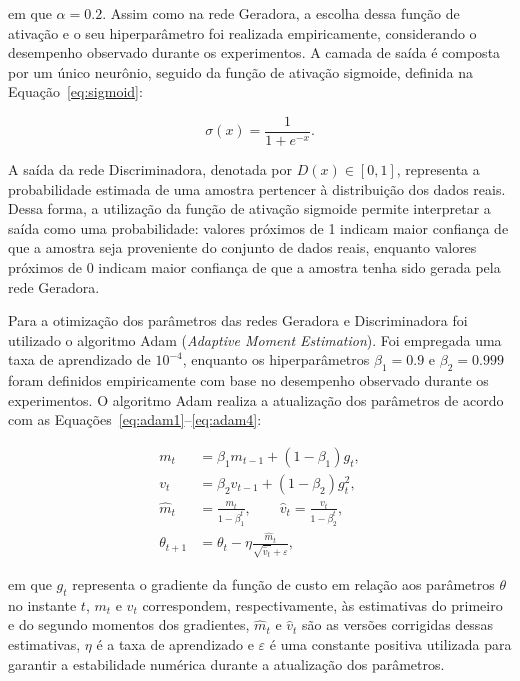 em que $\alpha = 0.2$. Assim como na rede Geradora, a escolha dessa função de ativação e o seu hiperparâmetro foi realizada empiricamente, considerando o desempenho observado durante os experimentos. A camada de saída é composta por um único neurônio, seguido da função de ativação sigmoide, definida na Equação~\ref{eq:sigmoid}:

\begin{equation}
\sigma(x)=\frac{1}{1+e^{-x}}.
\label{eq:sigmoid}
\end{equation}

A saída da rede Discriminadora, denotada por $D(x)\in[0,1]$, representa a probabilidade estimada de uma amostra pertencer à distribuição dos dados reais. Dessa forma, a utilização da função de ativação sigmoide permite interpretar a saída como uma probabilidade: valores próximos de 1 indicam maior confiança de que a amostra seja proveniente do conjunto de dados reais, enquanto valores próximos de 0 indicam maior confiança de que a amostra tenha sido gerada pela rede Geradora.

Para a otimização dos parâmetros das redes Geradora e Discriminadora foi utilizado o algoritmo Adam (\textit{Adaptive Moment Estimation}). Foi empregada uma taxa de aprendizado de $10^{-4}$, enquanto os hiperparâmetros $\beta_1 = 0.9$ e $\beta_2 = 0.999$ foram definidos empiricamente com base no desempenho observado durante os experimentos. O algoritmo Adam realiza a atualização dos parâmetros de acordo com as Equações~\ref{eq:adam1}--\ref{eq:adam4}:

\begin{align}
m_t &= \beta_1 m_{t-1} + (1-\beta_1)g_t,
\label{eq:adam1}\\
v_t &= \beta_2 v_{t-1} + (1-\beta_2)g_t^2,
\label{eq:adam2}\\
\hat{m}_t &= \frac{m_t}{1-\beta_1^t}, \qquad
\hat{v}_t = \frac{v_t}{1-\beta_2^t},
\label{eq:adam3}\\
\theta_{t+1} &= \theta_t - \eta\frac{\hat{m}_t}{\sqrt{\hat{v}_t}+\varepsilon},
\label{eq:adam4}
\end{align}

em que $g_t$ representa o gradiente da função de custo em relação aos parâmetros $\theta$ no instante $t$, $m_t$ e $v_t$ correspondem, respectivamente, às estimativas do primeiro e do segundo momentos dos gradientes, $\hat{m}_t$ e $\hat{v}_t$ são as versões corrigidas dessas estimativas, $\eta$ é a taxa de aprendizado e $\varepsilon$ é uma constante positiva utilizada para garantir a estabilidade numérica durante a atualização dos parâmetros.

